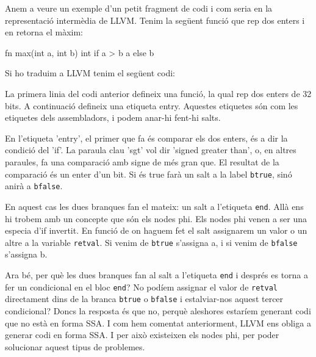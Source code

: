 ﻿\documentclass{article}
\begin{document}
Anem a veure un exemple d'un petit fragment de codi i com seria en la
representació intermèdia de LLVM. Tenim la següent funció  que rep dos enters i
en retorna el màxim:

\begin{code}
fn max(int a, int b) int {
    if a > b { a } else { b }
}
\end{code}

Si ho traduim a LLVM tenim el següent codi:


La primera linia del codi anterior defineix una funció, la qual rep dos enters
de 32 bits. A continuació defineix una etiqueta entry. Aquestes etiquetes són
com les etiquetes dels assembladors, i podem anar-hi fent-hi salts.

En l'etiqueta 'entry', el primer que fa és comparar els dos enters, és a dir la
condició del 'if'. La paraula clau 'sgt' vol dir 'signed greater than', o, en
altres paraules, fa una comparació amb signe de més gran que. El resultat de la
comparació és un enter d'un bit. Si és true farà un salt a la label
\texttt{btrue}, sinó anirà a \texttt{bfalse}. 

En aquest cas les dues branques fan el mateix: un salt a l'etiqueta
\texttt{end}. Allà ens hi trobem amb un concepte que són els nodes phi. Els 
nodes phi venen a ser una especia d'if invertit. En funció de on haguem fet el 
salt assignarem un valor o un altre a la variable \texttt{retval}. Si venim de
\texttt{btrue} s'assigna a, i si venim de \texttt{bfalse} s'assigna b.

Ara bé, per què les dues branques fan al salt a l'etiqueta \texttt{end} i
després es torna a fer un condicional en el bloc \texttt{end}? No podíem
assignar el valor de \texttt{retval} directament dins de la branca
\texttt{btrue} o \texttt{bfalse} i estalviar-nos aquest tercer condicional?
Doncs la resposta és que no, perquè aleshores estaríem generant codi que no està
en forma SSA. I com hem comentat anteriorment, LLVM ens obliga a generar codi en
forma SSA. I per això existeixen els nodes phi, per poder solucionar aquest
tipus de problemes.
\end{document}
